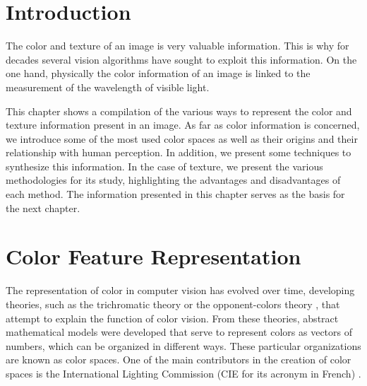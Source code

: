 \section{Introduction}
The color and texture of an image is very valuable information. This is why for decades several vision algorithms have sought to exploit this information. On the one hand, physically the color information of an image is linked to the measurement of the wavelength of visible light.


This chapter shows a compilation of the various ways to represent the color and texture information present in an image. As far as color information is concerned, we introduce some of the most used color spaces as well as their origins and their relationship with human perception. In addition, we present some techniques to synthesize this information. In the case of texture, we present the various methodologies for its study, highlighting the advantages and disadvantages of each method. The information presented in this chapter serves as the basis for the next chapter.


\section{Color Feature Representation}

The representation of color in computer vision has evolved over time, developing theories, such as the trichromatic theory or the opponent-colors theory \citep{Fairchild:Book:2005}, that attempt to explain the function of color vision. From these theories, abstract mathematical models were developed that serve to represent colors as vectors of numbers, which can be organized in different ways. These particular organizations are known as color spaces. One of the main contributors in the creation of color spaces is the International Lighting Commission (CIE for its acronym in French) \citep{Wright:BookCh2:2007}.

